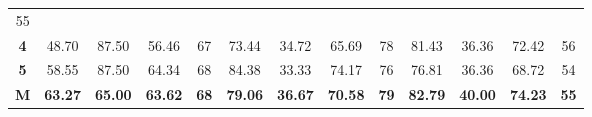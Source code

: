 \begin{table}[H]
{\begin{tabular}{ccccccccccccc}
			\multicolumn{1}{c|}{55} \\ \cline{2-13} 
			\multicolumn{1}{c|}{\cellcolor[HTML]{D9D9D9}\textbf{4}} &
			\multicolumn{1}{c|}{48.70} &
			\multicolumn{1}{c|}{87.50} &
			\multicolumn{1}{c|}{56.46} &
			\multicolumn{1}{c|}{67} &
			\multicolumn{1}{c|}{73.44} &
			\multicolumn{1}{c|}{34.72} &
			\multicolumn{1}{c|}{65.69} &
			\multicolumn{1}{c|}{78} &
			\multicolumn{1}{c|}{81.43} &
			\multicolumn{1}{c|}{36.36} &
			\multicolumn{1}{c|}{72.42} &
			\multicolumn{1}{c|}{56} \\ \cline{2-13} 
			\multicolumn{1}{c|}{\cellcolor[HTML]{D9D9D9}\textbf{5}} &
			\multicolumn{1}{c|}{58.55} &
			\multicolumn{1}{c|}{87.50} &
			\multicolumn{1}{c|}{64.34} &
			\multicolumn{1}{c|}{68} &
			\multicolumn{1}{c|}{84.38} &
			\multicolumn{1}{c|}{33.33} &
			\multicolumn{1}{c|}{74.17} &
			\multicolumn{1}{c|}{76} &
			\multicolumn{1}{c|}{76.81} &
			\multicolumn{1}{c|}{36.36} &
			\multicolumn{1}{c|}{68.72} &
			\multicolumn{1}{c|}{54} \\ \cline{2-13} 
			\multicolumn{1}{c|}{\cellcolor[HTML]{FFFF00}\textbf{M}} &
			\multicolumn{1}{c|}{\textbf{63.27}} &
			\multicolumn{1}{c|}{\textbf{65.00}} &
			\multicolumn{1}{c|}{\textbf{63.62}} &
			\multicolumn{1}{c|}{\textbf{68}} &
			\multicolumn{1}{c|}{\textbf{79.06}} &
			\multicolumn{1}{c|}{\textbf{36.67}} &
			\multicolumn{1}{c|}{\textbf{70.58}} &
			\multicolumn{1}{c|}{\textbf{79}} &
			\multicolumn{1}{c|}{\textbf{82.79}} &
			\multicolumn{1}{c|}{\textbf{40.00}} &
			\multicolumn{1}{c|}{\textbf{74.23}} &
			\multicolumn{1}{c|}{\textbf{55}} \\ \cline{2-13} 
		\end{tabular}%
	}
\end{table}